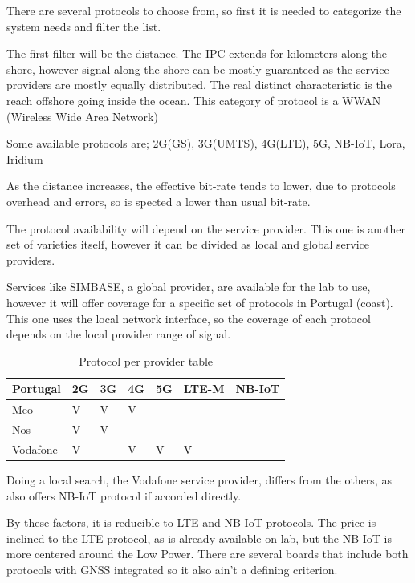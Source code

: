 There are several protocols to choose from, so first it is needed to categorize the 
system needs and filter the list.

The first filter will be the distance. The IPC extends for kilometers along the shore, 
however signal along the shore can be mostly guaranteed as the service providers are 
mostly equally distributed. The real distinct characteristic is the reach offshore 
going inside the ocean. This category of protocol is a WWAN (Wireless Wide Area Network)

Some available protocols are; 2G(GS), 3G(UMTS), 4G(LTE), 5G, NB-IoT, Lora, Iridium

As the distance increases, the effective bit-rate tends to lower, due to protocols 
overhead and errors, so is spected a lower than usual bit-rate.

The protocol availability will depend on the service provider. This one is another set of
varieties itself, however it can be divided as local and global service providers. 

Services like SIMBASE, a global provider, are available for the lab to use, however it will offer coverage for 
a specific set of protocols in Portugal (coast). This one uses the local network interface,
so the coverage of each protocol depends on the local provider range of signal.

\begin{table}[h!]
    \centering
    \begin{tabular}{l|l|l|l|l|l|l}
    Portugal & 2G & 3G & 4G & 5G & LTE-M & NB-IoT   \\
    \hline
    Meo      & V  & V  & V  & -- & --    & --       \\
    Nos      & V  & V  & -- & -- & --    & --       \\
    Vodafone & V  & -- & V  & V  & V     & -- 
    \end{tabular}
    \caption{Protocol per provider table}
    \label{table: Protocol per provider table}
\end{table}

Doing a local search, the Vodafone service provider, differs from the others, as
also offers NB-IoT protocol if accorded directly.

By these factors, it is reducible to LTE and NB-IoT protocols. The price is inclined to
the LTE protocol, as is already available on lab, but the NB-IoT is more centered 
around the Low Power. There are several boards that include both protocols with GNSS 
integrated so it also ain't a defining criterion.

